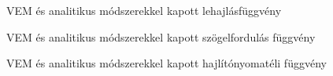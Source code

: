 \documentclass[a4paper, 12pt]{scrartcl}
\begin{document}
\begin{figure}[H]
  \hfill
  
  \vspace{-3mm}
  \caption{VEM és \textcolor{cyan!40!black}{ana}\textcolor{yellow!40!black}{liti}\textcolor{red!40!black}{kus} módszerekkel kapott lehajlásfüggvény}
  \label{fig:plot-v}
\end{figure}
\vspace{-3mm}
\begin{figure}[H]
  \hfill
  
  \vspace{-3mm}
  \caption{VEM és \textcolor{cyan!40!black}{ana}\textcolor{yellow!40!black}{liti}\textcolor{red!40!black}{kus} módszerekkel kapott szögelfordulás függvény}
  \label{fig:plot-phi}
\end{figure}
\vspace{-3mm}
\begin{figure}[H]
  \hfill
  
  \vspace{-3mm}
  \caption{VEM és \textcolor{cyan!40!black}{ana}\textcolor{yellow!40!black}{liti}\textcolor{red!40!black}{kus} módszerekkel kapott hajlítónyomatéli függvény}
  \label{fig:plot-Mh}
\end{figure}
\end{document}
